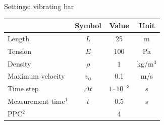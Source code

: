 \documentclass[mathserif,professionalfont,hyperref={pdfpagelabels=false}]{beamer}
\begin{document}
%

\begin{frame}{Settings: vibrating bar}
\begin{table}[h]
\centering
\begin{tabular}{l | c c c}
 & Symbol & Value & Unit \\
\hline
Length& $L$ & 25 & m\\
Tension& $E$ & $ 100$ & Pa\\
Density & $\rho$ & $1$ & kg/m$^3$\\
Maximum velocity & $v_0$ & 0.1 & m/s\\
Time step & $\Delta t$ &$ 1 \cdot10^{-3}$ & s\\
Measurement time$^1$ & $t$ & 0.5 & s\\
PPC$^2$ & & 4 & \\
\end{tabular}
\end{table}



\end{frame}
\end{document}

